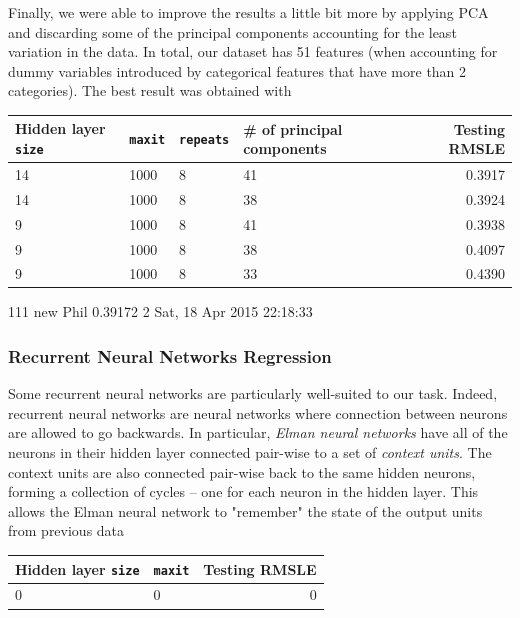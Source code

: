 \documentclass[12pt]{article}
\begin{document}
Finally, we were able to improve the results a little bit more by applying PCA and discarding some of the principal components accounting for the least variation in the data. In total, our dataset has 51 features (when accounting for dummy variables introduced by categorical features that have more than 2 categories). The best result was obtained with 

\begin{table}[H]
	\centering
	\begin{tabular}{llllr}
		Hidden layer \texttt{size} & \texttt{maxit} & \texttt{repeats} & \# of principal components & Testing RMSLE \\
		\hline
		14 & 1000 & 8 & 41 & 0.3917\\
		14 & 1000 & 8 & 38 & 0.3924\\
		9 & 1000 & 8 & 41 & 0.3938\\
		9 & 1000 & 8 & 38 & 0.4097\\
		9 & 1000 & 8 & 33 & 0.4390\\
	\end{tabular}
\end{table}

111	new	Phil	
0.39172
2	Sat, 18 Apr 2015 22:18:33


\subsubsection{Recurrent Neural Networks Regression}
Some recurrent neural networks are particularly well-suited to our task. Indeed, recurrent neural networks are neural networks where connection between neurons are allowed to go backwards. In particular, \emph{Elman neural networks} have all of the neurons in their hidden layer connected pair-wise to a set of \emph{context units}. The context units are also connected pair-wise back to the same hidden neurons, forming a collection of cycles -- one for each neuron in the hidden layer. This allows the Elman neural network to "remember" the state of the output units from previous data



\begin{table}[H]
	\centering
	\begin{tabular}{llr}
		Hidden layer \texttt{size} & \texttt{maxit} & Testing RMSLE \\
		\hline
		0 & 0 & 0\\
	\end{tabular}
\end{table}
\end{document}
